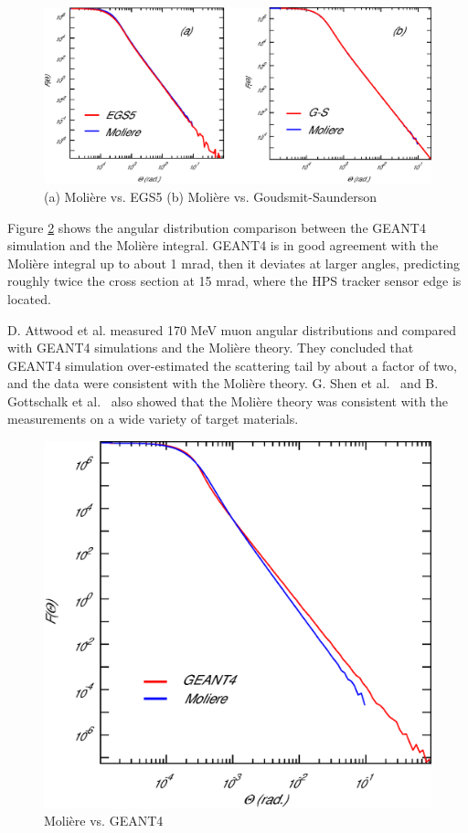 \begin{figure}[h]
\includegraphics[height=3 in]{appendix/appendix_1.eps}
\caption{\small{ (a) Moli\`{e}re vs. EGS5 \hspace{1 cm} (b) Moli\`{e}re vs. Goudsmit-Saunderson}}
\label{appendix:1}
\end{figure}

Figure \ref{appendix:2} shows the angular distribution comparison between the GEANT4 
simulation and the Moli\`{e}re integral. 
GEANT4 is in good agreement with the Moli\`{e}re integral up to about 1 mrad, then it 
deviates at larger angles, predicting roughly twice the cross section at 15 mrad, 
where the HPS tracker sensor edge is located.

D. Attwood et al. measured 170 MeV muon angular distributions and compared with 
GEANT4 simulations and the Moli\`{e}re theory. \cite{attwood} They concluded that GEANT4 
simulation over-estimated the scattering tail by about a factor of two, and the data were consistent
with the Moli\`{e}re theory. G. Shen et al.~ \cite{shen} and B. Gottschalk et al.~ \cite{gottschalk}
also showed that the Moli\`{e}re theory was consistent with the measurements on a wide variety of
target materials.

\begin{figure}[h]
\includegraphics[height= 3 in]{appendix/appendix_2.eps}
\caption{\small{ Moli\`{e}re vs. GEANT4 }}
\label{appendix:2}
\end{figure}

